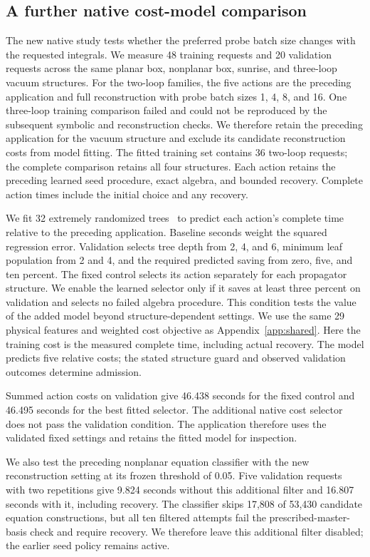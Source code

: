 \subsection{A further native cost-model comparison}
The new native study tests whether the preferred probe batch size changes with the requested integrals. We measure 48 training requests and 20 validation requests across the same planar box, nonplanar box, sunrise, and three-loop vacuum structures. For the two-loop families, the five actions are the preceding application and full reconstruction with probe batch sizes 1, 4, 8, and 16. One three-loop training comparison failed and could not be reproduced by the subsequent symbolic and reconstruction checks. We therefore retain the preceding application for the vacuum structure and exclude its candidate reconstruction costs from model fitting. The fitted training set contains 36 two-loop requests; the complete comparison retains all four structures. Each action retains the preceding learned seed procedure, exact algebra, and bounded recovery. Complete action times include the initial choice and any recovery.

We fit 32 extremely randomized trees~\cite{Geurts2006ExtraTrees} to predict each action's complete time relative to the preceding application. Baseline seconds weight the squared regression error. Validation selects tree depth from 2, 4, and 6, minimum leaf population from 2 and 4, and the required predicted saving from zero, five, and ten percent. The fixed control selects its action separately for each propagator structure. We enable the learned selector only if it saves at least three percent on validation and selects no failed algebra procedure. This condition tests the value of the added model beyond structure-dependent settings. We use the same 29 physical features and weighted cost objective as Appendix~\ref{app:shared}. Here the training cost is the measured complete time, including actual recovery. The model predicts five relative costs; the stated structure guard and observed validation outcomes determine admission.

Summed action costs on validation give 46.438 seconds for the fixed control and 46.495 seconds for the best fitted selector. The additional native cost selector does not pass the validation condition. The application therefore uses the validated fixed settings and retains the fitted model for inspection.

We also test the preceding nonplanar equation classifier with the new reconstruction setting at its frozen threshold of 0.05. Five validation requests with two repetitions give 9.824 seconds without this additional filter and 16.807 seconds with it, including recovery. The classifier skips 17,808 of 53,430 candidate equation constructions, but all ten filtered attempts fail the prescribed-master-basis check and require recovery. We therefore leave this additional filter disabled; the earlier seed policy remains active.
